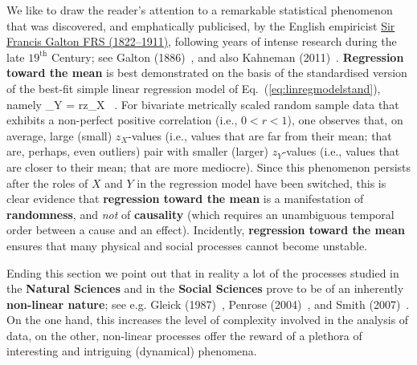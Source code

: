 \medskip
\noindent
We like to draw the reader's attention 
to a remarkable statistical phenomenon that was discovered, and 
emphatically publicised, by the English empiricist 
\href{http://www-history.mcs.st-and.ac.uk/Biographies/Galton.html}{Sir
Francis Galton FRS (1822--1911)}, following years of intense 
research during the late $19^\mathrm{th}$ Century; see Galton 
(1886)~, and also Kahneman (2011)~.
\textbf{Regression toward the mean} is best demonstrated on the
basis of the standardised version of the best-fit simple linear 
regression model of Eq.~(\ref{eq:linregmodelstand}), namely
%
\be
{}
_{Y} = rz_{X} \ .
\ee
%
For bivariate metrically scaled random sample data that exhibits a 
non-perfect positive correlation (i.e., $0 < r < 1$), one observes
that, on average, large (small) $z_{X}$-values (i.e., values that
are far from their mean; that are, perhaps, even outliers) pair
with smaller (larger) $z_{Y}$-values (i.e., values that are closer
to their mean; that are more mediocre). Since this phenomenon 
persists after the roles of $X$ and $Y$ in the regression model 
have been switched, this is clear evidence that \textbf{regression 
toward the mean} is a manifestation of \textbf{randomness}, and 
\textit{not} of \textbf{causality} (which requires an unambiguous 
temporal order between a cause and an effect). Incidently,
\textbf{regression toward the mean} ensures that many physical and
social processes cannot become unstable.

\medskip
\noindent
Ending this section we point out that in reality a lot of the
processes studied in the \textbf{Natural Sciences} and in the
\textbf{Social Sciences} prove to be of an inherently
\textbf{non-linear nature};
see e.g. Gleick (1987)~, Penrose (2004)~,
and Smith (2007)~. On the one hand, this increases the
level of complexity involved in the analysis of data, on the other, 
non-linear processes offer the reward of a plethora of interesting 
and intriguing (dynamical) phenomena.

